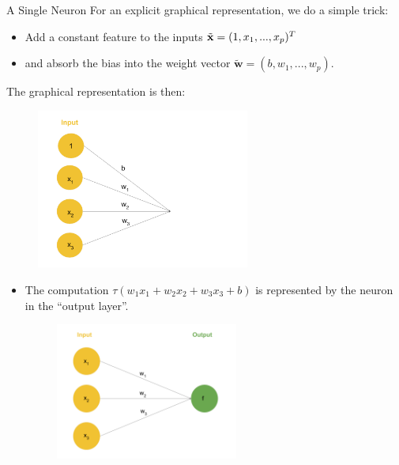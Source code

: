 \documentclass[11pt,compress,t,notes=noshow, xcolor=table]{beamer}
\begin{document}
\begin{vbframe} {A Single Neuron}
For an explicit graphical representation, we do a simple trick: 
\begin{itemize}
\item Add a constant feature to the inputs $\tilde{\mathbf{x}} = (1, x_1, ..., x_p)^T$
\item and absorb the bias into the weight vector $\tilde{\bm{w}} = (b, w_1, ..., w_p)$.
\end{itemize}
The graphical representation is then: 
\begin{figure}
\includegraphics[width=7cm]{figure/neurep_bias.png}
\end{figure}
\framebreak

\begin{itemize}
\item %
The computation $\tau(w_1x_1 + w_2x_2 + w_3x_3 + b)$ is represented by the neuron in the \enquote{output layer}.
\begin{figure}
\includegraphics[width=6cm]{figure/neurep_three.png}
\end{figure}
\framebreak


\end{itemize}
\end{vbframe}
\end{document}
